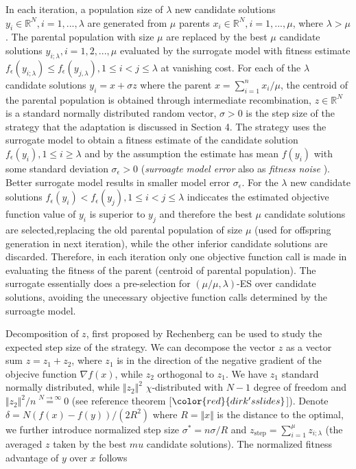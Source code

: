 In each iteration, a population size of $\lambda$ new candidate solutions $y_i \in \mathbb{R}^N,i = 1,...,\lambda $ are generated from $\mu$ parents $x_i \in \mathbb{R}^N, i=1,...,\mu$, where $\lambda>\mu$. The parental population with size $\mu$ are replaced by the best $\mu$ candidate solutions $y_{i;\lambda},i = 1,2,...,\mu$ evaluated by the surrogate model with fitness estimate $f_{\epsilon}(y_{i;\lambda}) \leq f_{\epsilon}(y_{j,\lambda}), 1 \leq i < j \leq \lambda$ at vanishing cost. For each of the $\lambda$ candidate solutions $y_i=x + \sigma z$ where the parent $x = \sum_{i=1}^n x_i/\mu$, the centroid of the parental population is obtained through intermediate recombination, $z \in  \mathbb R^N$ is a standard normally distributed random vector, $\sigma > 0$ is the step size of the strategy that the adaptation is discussed in Section 4. The strategy uses the surrogate model to obtain a fitness estimate of the candidate solution $f_{\epsilon} (y_i), 1 \leq i \geq \lambda$ and by the assumption the estimate has mean $f(y_i)$ with some standard deviation $\sigma_\epsilon > 0$ (\textit{surroagte model error} also as \textit{fitness noise} \cite{1284729}). Better surrogate model results in smaller model error $\sigma_\epsilon$. For the $\lambda$ new candidate solutions $f_\epsilon (y_i) < f_\epsilon (y_j), 1 \leq i < j \leq \lambda$ indiccates the estimated objective function value of $y_i$ is superior to $y_j$ and therefore the best $\mu$ candidate solutions are selected,replacing the old parental population of size $\mu$ (used for offspring generation in next iteration), while the other inferior candidate solutions are discarded. Therefore, in each iteration only one objective function call is made in evaluating the fitness of the parent (centroid of parental population). The surrogate essentially does a pre-selection for $(\mu/\mu,\lambda)$-ES over candidate solutions, avoiding the unecessary objective function calls determined by the surroagte model.  

Decomposition of $z$, first proposed by Rechenberg \cite{rechenberg1973evolutionsstrategie} can be used to study the expected step size of the strategy. We can decompose the vector $z$ as a vector sum $z = z_1 + z_2$, where $z_1$ is in the direction of the negative gradient of the objecive function $\nabla f(x)$, while $z_2$ orthogonal to $z_1$. We have $z_1$ standard normally distributed, while $\Vert z_2\Vert^2$ $\chi$-distributed with $N-1$ degree of freedom and $ \Vert z_2\Vert^2 /n \overset{N \rightarrow \infty }{=} 0$ (see reference theorem [$\color{red}{dirk's slides }$]). Denote $\delta = N (f(x) - f(y))/(2R^2)$ where $R = \Vert x \Vert$ is the distance to the optimal, we further introduce normalized step size $\sigma^* = n \sigma/R$ and $z_{\text{step}} = \sum_{i=1}^\mu z_{i;\lambda}$ (the averaged $z$ taken by the best $mu$ candidate solutions). The normalized fitness advantage of $y$ over $x$ follows

